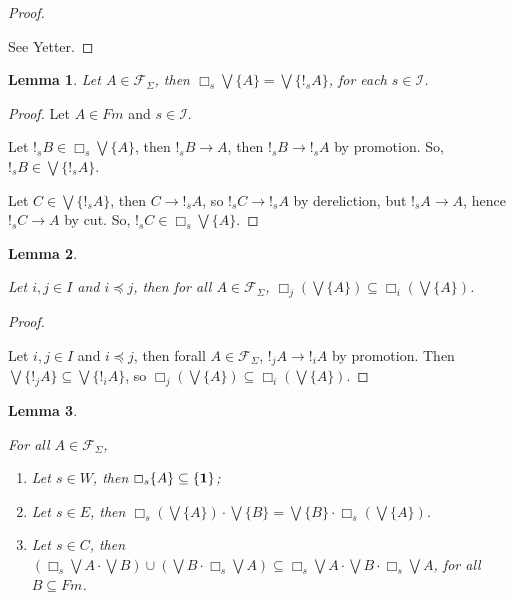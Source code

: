 \documentclass[a4paper]{article}
\theoremstyle{defin}
\theoremstyle{theorem}
\theoremstyle{prop}
\theoremstyle{lemma}
\newtheorem{lemma}{Lemma}
\theoremstyle{ex}
\theoremstyle{col}
\begin{document}
\begin{proof}
$ $

See Yetter.
\end{proof}

\begin{lemma}
  Let $A \in \mathcal{F}_{\Sigma}$, then $\Box_s \bigvee \{ A \} = \bigvee \{ !_s A \}$, for each $s \in \mathcal{I}$.
\end{lemma}

\begin{proof}
  Let $A \in Fm$ and $s \in \mathcal{I}$.

  Let $!_s B \in \Box_s \bigvee \{ A \}$, then $!_s B \rightarrow A$, then $!_s B \rightarrow !_s A$
  by promotion. So, $!_s B \in \bigvee \{ !_s A \}$.

  Let $C \in \bigvee \{ !_s A \}$, then $C \rightarrow !_s A$, so $!_s C \rightarrow !_s A$ by dereliction, but $!_s A \rightarrow A$, hence
  $!_s C \rightarrow A$ by cut. So, $!_s C \in \Box_s \bigvee \{ A \}$.
\end{proof}

\begin{lemma}
$ $

  Let $i, j \in I$ and $i \preceq j$, then for all $A \in \mathcal{F}_{\Sigma}$, $\Box_j (\bigvee \{ A \}) \subseteq \Box_i (\bigvee \{ A \})$.
\end{lemma}

\begin{proof}
$ $

  Let $i, j \in I$ and $i \preceq j$, then forall $A \in \mathcal{F}_{\Sigma}$, $!_j A \rightarrow !_i A$ by promotion.
  Then $\bigvee \{ !_j A \} \subseteq \bigvee \{ !_i A \}$, so $\Box_j (\bigvee \{ A \}) \subseteq \Box_i (\bigvee \{ A \})$.
\end{proof}

\begin{lemma}
$ $

For all $A \in \mathcal{F}_{\Sigma}$,
  \begin{enumerate}
    \item Let $s \in W$, then $\Box_s \{ A \} \subseteq \{ {\bf 1} \}$;
    \item Let $s \in E$, then $\Box_s (\bigvee \{ A \}) \cdot \bigvee \{ B \} = \bigvee \{ B\} \cdot \Box_s (\bigvee \{ A \})$.
    \item Let $s \in C$, then $(\Box_s \bigvee A \cdot \bigvee B) \cup (\bigvee B \cdot \Box_s \bigvee A) \subseteq \Box_s \bigvee A \cdot \bigvee B \cdot \Box_s \bigvee A$, for all $B \subseteq Fm$.
  \end{enumerate}
\end{lemma}
\end{document}
